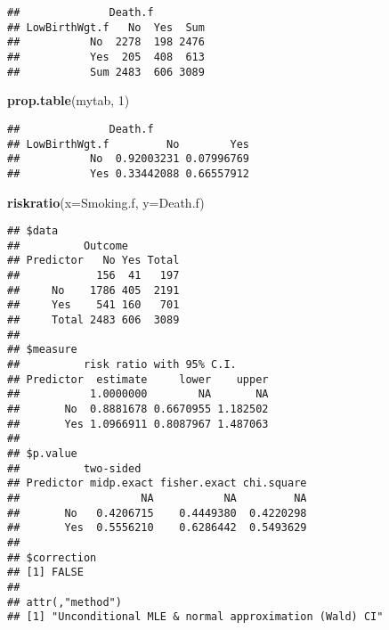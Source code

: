 \documentclass[]{article}
\newenvironment{Shaded}{\begin{snugshade}}{\end{snugshade}}
\newcommand{\KeywordTok}[1]{\textcolor[rgb]{0.13,0.29,0.53}{\textbf{#1}}}
\newcommand{\DataTypeTok}[1]{\textcolor[rgb]{0.13,0.29,0.53}{#1}}
\newcommand{\DecValTok}[1]{\textcolor[rgb]{0.00,0.00,0.81}{#1}}
\newcommand{\NormalTok}[1]{#1}
\begin{document}
\begin{verbatim}
##              Death.f
## LowBirthWgt.f   No  Yes  Sum
##           No  2278  198 2476
##           Yes  205  408  613
##           Sum 2483  606 3089
\end{verbatim}

\begin{Shaded}
\begin{Highlighting}[]
\KeywordTok{prop.table}\NormalTok{(mytab, }\DecValTok{1}\NormalTok{)}
\end{Highlighting}
\end{Shaded}

\begin{verbatim}
##              Death.f
## LowBirthWgt.f         No        Yes
##           No  0.92003231 0.07996769
##           Yes 0.33442088 0.66557912
\end{verbatim}

\begin{Shaded}
\begin{Highlighting}[]
\KeywordTok{riskratio}\NormalTok{(}\DataTypeTok{x=}\NormalTok{Smoking.f, }\DataTypeTok{y=}\NormalTok{Death.f)}
\end{Highlighting}
\end{Shaded}

\begin{verbatim}
## $data
##          Outcome
## Predictor   No Yes Total
##            156  41   197
##     No    1786 405  2191
##     Yes    541 160   701
##     Total 2483 606  3089
## 
## $measure
##          risk ratio with 95% C.I.
## Predictor  estimate     lower    upper
##           1.0000000        NA       NA
##       No  0.8881678 0.6670955 1.182502
##       Yes 1.0966911 0.8087967 1.487063
## 
## $p.value
##          two-sided
## Predictor midp.exact fisher.exact chi.square
##                   NA           NA         NA
##       No   0.4206715    0.4449380  0.4220298
##       Yes  0.5556210    0.6286442  0.5493629
## 
## $correction
## [1] FALSE
## 
## attr(,"method")
## [1] "Unconditional MLE & normal approximation (Wald) CI"
\end{verbatim}
\end{document}
